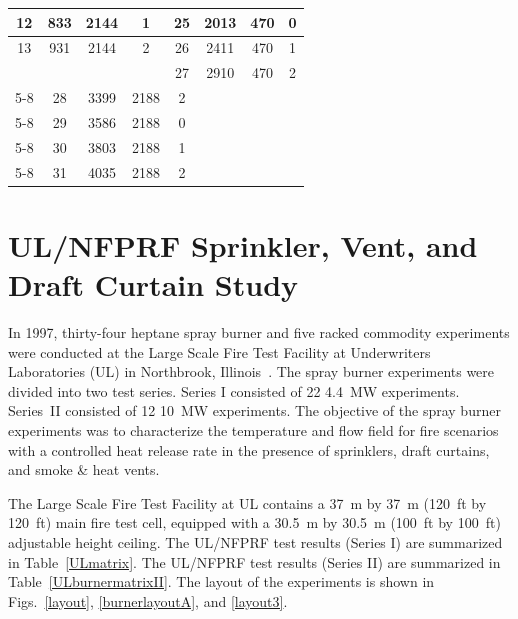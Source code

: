 \begin{table}[h!]
\begin{tabular}{|c|c|c|c||c|c|c|c|}
12      & 833       & 2144          & 1         & 25      & 2013      & 470           & 0                 \\ \hline
13      & 931       & 2144          & 2         & 26      & 2411      & 470           & 1                 \\ \hline
\multicolumn{4}{|r||}{}                         & 27      & 2910      & 470           & 2                 \\ \cline{5-8}
\multicolumn{4}{|r||}{}                         & 28      & 3399      & 2188          & 2                 \\ \cline{5-8}
\multicolumn{4}{|r||}{}                         & 29      & 3586      & 2188          & 0                 \\ \cline{5-8}
\multicolumn{4}{|r||}{}                         & 30      & 3803      & 2188          & 1                 \\ \cline{5-8}
\multicolumn{4}{|r||}{}                         & 31      & 4035      & 2188          & 2                 \\ \hline
\end{tabular}
\label{UL_NIST_Table}
\end{table}


\FloatBarrier

\section{UL/NFPRF Sprinkler, Vent, and Draft Curtain Study}
\label{UL_NFPRF_Description}

In 1997, thirty-four heptane spray burner and five racked commodity experiments were conducted at the Large Scale Fire Test Facility at Underwriters Laboratories (UL) in Northbrook, Illinois~\cite{Sheppard:1,McGrattan:5}. The spray burner experiments were divided into two test series. Series I consisted of 22 4.4~MW experiments. Series~II consisted of 12 10~MW experiments. The objective of the spray burner experiments was to characterize the temperature and flow field for fire scenarios with a controlled heat release rate in the presence of sprinklers, draft curtains, and smoke \& heat vents.

The Large Scale Fire Test Facility at UL contains a 37~m by 37~m (120~ft by 120~ft) main fire test cell, equipped with a 30.5~m by 30.5~m (100~ft by 100~ft) adjustable height ceiling. The UL/NFPRF test results (Series I) are summarized in Table~\ref{ULmatrix}. The UL/NFPRF test results (Series II) are summarized in Table~\ref{ULburnermatrixII}. The layout of the experiments is shown in Figs.~\ref{layout}, \ref{burnerlayoutA}, and \ref{layout3}.

